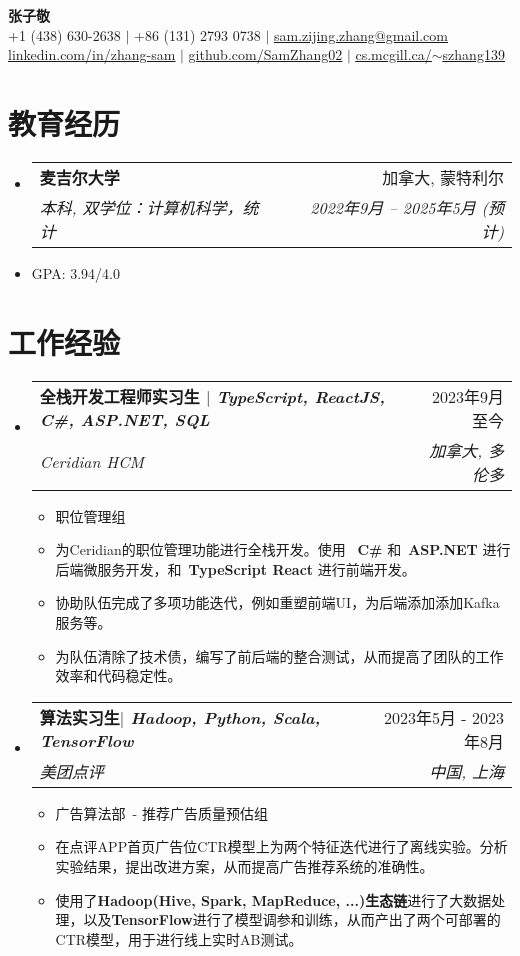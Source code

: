 \documentclass[letterpaper,11pt]{article}
\makeatletter
\newcommand{\resumeItem}[1]{
  \item\small{
    {#1 \vspace{-2pt}}
  }
}
\newcommand{\resumeSubheading}[4]{
  \vspace{-2pt}\item
  \begin{tabular*}{0.97\textwidth}[t]{l@{\extracolsep{\fill}}r}
    \textbf{#1} & #2 \\
    \textit{\small#3} & \textit{\small #4} \\
  \end{tabular*}\vspace{-7pt}
}
\newcommand{\resumeSubHeadingListStart}{\begin{itemize}[leftmargin=0.15in, label={}]}
\newcommand{\resumeSubHeadingListEnd}{\end{itemize}}
\newcommand{\resumeItemListStart}{\begin{itemize}}
\newcommand{\resumeItemListEnd}{\end{itemize}\vspace{-5pt}}
\makeatother
\begin{document}
\begin{CJK*}{UTF8}{gbsn}


  \begin{center}
    \textbf{\Huge \scshape 张子敬} \\ \vspace{1pt}
    \small +1 (438) 630-2638 $|$ +86 (131) 2793 0738 $|$ \href{mailto:sam.zijing.zhang@gmail.com}{\underline{sam.zijing.zhang@gmail.com}}  \\
    \href{https://linkedin.com/in/zhang-sam}{\underline{linkedin.com/in/zhang-sam}} $|$
    \href{https://github.com/SamZhang02}{\underline{github.com/SamZhang02}} $|$
    \href{https://cs.mcgill.ca/~szhang139}{\underline{cs.mcgill.ca/$\sim$szhang139}}
  \end{center}

  \section{教育经历}
  \resumeSubHeadingListStart
  \resumeSubheading
  {麦吉尔大学}{加拿大, 蒙特利尔}
  {本科, 双学位：计算机科学，统计}{2022年9月 -- 2025年5月 (预计)}
  \resumeItem{GPA: 3.94/4.0}
  \resumeSubHeadingListEnd

  \section{工作经验}
  \resumeSubHeadingListStart

  \resumeSubheading
  {{全栈开发工程师实习生} $|$ \emph{TypeScript, ReactJS, C\#, ASP.NET, SQL}}
  {2023年9月至今}
  {Ceridian HCM}{加拿大, 多伦多}
  \resumeItemListStart
  \resumeItem{职位管理组}
  \resumeItem{为Ceridian的职位管理功能进行全栈开发。使用 \ \textbf{C\#} 和\ \textbf{ASP.NET} 进行后端微服务开发，和\ \textbf{TypeScript React} 进行前端开发。}
  \resumeItem{协助队伍完成了多项功能迭代，例如重塑前端UI，为后端添加添加Kafka服务等。}
  \resumeItem{为队伍清除了技术债，编写了前后端的整合测试，从而提高了团队的工作效率和代码稳定性。}
  \resumeItemListEnd
  \resumeSubheading
  {{算法实习生}$|$ \emph{Hadoop, Python, Scala, TensorFlow}}
  {2023年5月 - 2023年8月}
  {美团点评}{中国, 上海}
  \resumeItemListStart
  \resumeItem{广告算法部\  - 推荐广告质量预估组}
  \resumeItem{
    在点评APP首页广告位CTR模型上为两个特征迭代进行了离线实验。分析实验结果，提出改进方案，从而提高广告推荐系统的准确性。
  }
  \resumeItem{
    使用了\textbf{Hadoop(Hive, Spark, MapReduce, ...)生态链}进行了大数据处理，以及\textbf{TensorFlow}进行了模型调参和训练，从而产出了两个可部署的CTR模型，用于进行线上实时AB测试。
  }
  \resumeItemListEnd
  \resumeSubHeadingListEnd


\end{CJK*}
\end{document}
